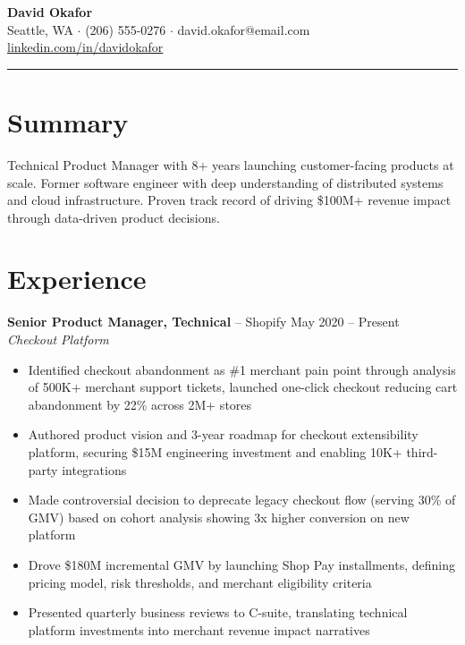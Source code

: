 \documentclass[11pt,letterpaper]{article}
\begin{document}
{\Large\bfseries David Okafor}\\[4pt]
Seattle, WA $\cdot$ (206) 555-0276 $\cdot$ david.okafor@email.com\\
\href{https://linkedin.com/in/davidokafor}{linkedin.com/in/davidokafor}

\vspace{4pt}
{\color{accent}\rule{\textwidth}{0.4pt}}

\section{Summary}

Technical Product Manager with 8+ years launching customer-facing products at scale. Former software engineer with deep understanding of distributed systems and cloud infrastructure. Proven track record of driving \$100M+ revenue impact through data-driven product decisions.

\section{Experience}

\textbf{Senior Product Manager, Technical} -- Shopify \hfill May 2020 -- Present\\
\textit{Checkout Platform}
\begin{itemize}
    \item Identified checkout abandonment as \#1 merchant pain point through analysis of 500K+ merchant support tickets, launched one-click checkout reducing cart abandonment by 22\% across 2M+ stores
    \item Authored product vision and 3-year roadmap for checkout extensibility platform, securing \$15M engineering investment and enabling 10K+ third-party integrations
    \item Made controversial decision to deprecate legacy checkout flow (serving 30\% of GMV) based on cohort analysis showing 3x higher conversion on new platform
    \item Drove \$180M incremental GMV by launching Shop Pay installments, defining pricing model, risk thresholds, and merchant eligibility criteria
    \item Presented quarterly business reviews to C-suite, translating technical platform investments into merchant revenue impact narratives
\end{itemize}
\end{document}
